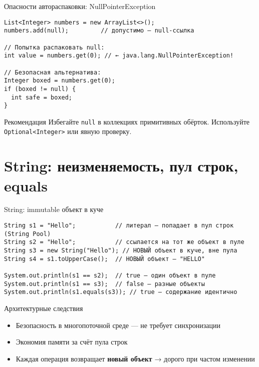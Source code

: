 \documentclass[aspectratio=169]{beamer}
\begin{document}
\begin{frame}[fragile]{Опасности автораспаковки: NullPointerException}
\lstset{language=JavaLite}
\begin{lstlisting}
List<Integer> numbers = new ArrayList<>();
numbers.add(null);         // допустимо — null-ссылка

// Попытка распаковать null:
int value = numbers.get(0); // ← java.lang.NullPointerException!

// Безопасная альтернатива:
Integer boxed = numbers.get(0);
if (boxed != null) {
  int safe = boxed;
}
\end{lstlisting}
  \begin{block}{Рекомендация}
    Избегайте \texttt{null} в коллекциях примитивных обёрток. Используйте \texttt{Optional<Integer>} или явную проверку.
  \end{block}
\end{frame}

\section{String: неизменяемость, пул строк, equals}

\begin{frame}[fragile]{String: immutable объект в куче}
\lstset{language=JavaLite}
\begin{lstlisting}
String s1 = "Hello";           // литерал — попадает в пул строк (String Pool)
String s2 = "Hello";           // ссылается на тот же объект в пуле
String s3 = new String("Hello"); // НОВЫЙ объект в куче, вне пула
String s4 = s1.toUpperCase();  // НОВЫЙ объект — "HELLO"

System.out.println(s1 == s2);  // true — один объект в пуле
System.out.println(s1 == s3);  // false — разные объекты
System.out.println(s1.equals(s3)); // true — содержание идентично
\end{lstlisting}
  \begin{block}{Архитектурные следствия}
    \begin{itemize}
      \item Безопасность в многопоточной среде — не требует синхронизации
      \item Экономия памяти за счёт пула строк
      \item Каждая операция возвращает \textbf{новый объект} → дорого при частом изменении
    \end{itemize}
  \end{block}
\end{frame}
\end{document}
